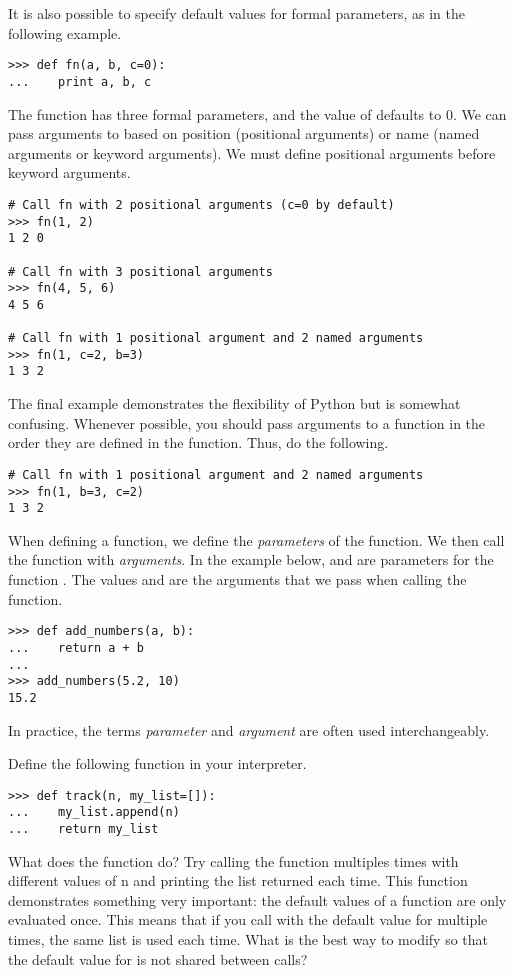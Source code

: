 It is also possible to specify default values for formal parameters, as in the following example.
\begin{lstlisting}
>>> def fn(a, b, c=0):
...    print a, b, c
\end{lstlisting}
The function  has three formal parameters, and the value of  defaults to 0.
We can pass arguments to  based on position (positional arguments) or name (named arguments or keyword arguments). We must define positional arguments before keyword arguments.
\begin{lstlisting}
# Call fn with 2 positional arguments (c=0 by default)
>>> fn(1, 2)
1 2 0

# Call fn with 3 positional arguments
>>> fn(4, 5, 6)
4 5 6

# Call fn with 1 positional argument and 2 named arguments
>>> fn(1, c=2, b=3)
1 3 2
\end{lstlisting}
The final example demonstrates the flexibility of Python but is somewhat confusing. Whenever possible, you should pass arguments to a function in the order they are defined in the function. Thus, do the following.
\begin{lstlisting}
# Call fn with 1 positional argument and 2 named arguments
>>> fn(1, b=3, c=2)
1 3 2
\end{lstlisting}

\begin{info}
When defining a function, we define the \emph{parameters} of the function.  We then call the function with \emph{arguments}.
In the example below,  and  are parameters for the function .
The values  and  are the arguments that we pass when calling the function.

\begin{lstlisting}
>>> def add_numbers(a, b):
...    return a + b
...
>>> add_numbers(5.2, 10)
15.2
\end{lstlisting}
In practice, the terms \emph{parameter} and \emph{argument} are often used interchangeably.
\end{info}

\begin{problem}
Define the following function in your interpreter.
\begin{lstlisting}
>>> def track(n, my_list=[]):
...    my_list.append(n)
...    return my_list
\end{lstlisting}
What does the function do?
Try calling the function multiples times with different values of n and printing the list returned each time.
This function demonstrates something very important: the default values of a function are only evaluated once.
This means that if you call  with the default value for  multiple times, the same list is used each time.
What is the best way to modify  so that the default value for  is not shared between calls?
\end{problem}


